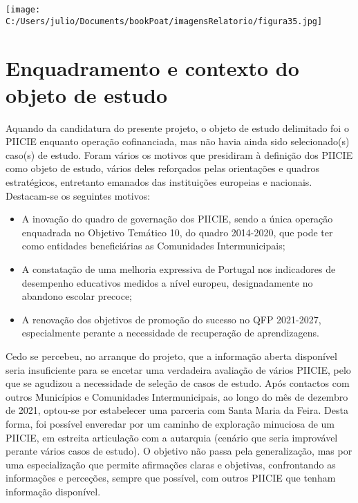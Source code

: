 \documentclass[
]{book}
\providecommand{\tightlist}{%
  \setlength{\itemsep}{0pt}\setlength{\parskip}{0pt}}
\begin{document}
\texttt{[image: C:/Users/julio/Documents/bookPoat/imagensRelatorio/figura35.jpg]}

\hypertarget{enquadramento-e-contexto-do-objeto-de-estudo}{%
\chapter{\texorpdfstring{\textbf{Enquadramento e contexto do objeto de estudo}}{Enquadramento e contexto do objeto de estudo}}\label{enquadramento-e-contexto-do-objeto-de-estudo}}

Aquando da candidatura do presente projeto, o objeto de estudo delimitado foi o PIICIE enquanto operação cofinanciada, mas não havia ainda sido selecionado(s) caso(s) de estudo. Foram vários os motivos que presidiram à definição dos PIICIE como objeto de estudo, vários deles reforçados pelas orientações e quadros estratégicos, entretanto emanados das instituições europeias e nacionais. Destacam-se os seguintes motivos:

\begin{itemize}
\tightlist
\item
  A inovação do quadro de governação dos PIICIE, sendo a única operação enquadrada no Objetivo Temático 10, do quadro 2014-2020, que pode ter como entidades beneficiárias as Comunidades Intermunicipais;
\item
  A constatação de uma melhoria expressiva de Portugal nos indicadores de desempenho educativos medidos a nível europeu, designadamente no abandono escolar precoce;
\item
  A renovação dos objetivos de promoção do sucesso no QFP 2021-2027, especialmente perante a necessidade de recuperação de aprendizagens.
\end{itemize}

Cedo se percebeu, no arranque do projeto, que a informação aberta disponível seria insuficiente para se encetar uma verdadeira avaliação de vários PIICIE, pelo que se agudizou a necessidade de seleção de casos de estudo. Após contactos com outros Municípios e Comunidades Intermunicipais, ao longo do mês de dezembro de 2021, optou-se por estabelecer uma parceria com Santa Maria da Feira. Desta forma, foi possível enveredar por um caminho de exploração minuciosa de um PIICIE, em estreita articulação com a autarquia (cenário que seria improvável perante vários casos de estudo). O objetivo não passa pela generalização, mas por uma especialização que permite afirmações claras e objetivas, confrontando as informações e perceções, sempre que possível, com outros PIICIE que tenham informação disponível.
\end{document}
